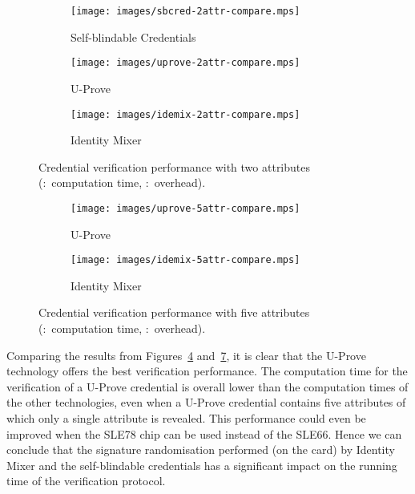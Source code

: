 \begin{figure}
  \centering
  \begin{subfigure}[b]{0.33\textwidth}
    \texttt{[image: images/sbcred-2attr-compare.mps]}
    \caption{Self-blindable Credentials}
    \label{fig:sbcred-2attr}
  \end{subfigure}
  \begin{subfigure}[b]{0.32\textwidth}
    \texttt{[image: images/uprove-2attr-compare.mps]}
    \caption{U-Prove}
    \label{fig:uprove-2attr}
  \end{subfigure}
  \begin{subfigure}[b]{0.32\textwidth}
    \texttt{[image: images/idemix-2attr-compare.mps]}
    \caption{Identity Mixer}
    \label{fig:idemix-2attr}
  \end{subfigure}

  \caption[Credential verification performance with two attributes.]{
    Credential verification performance with two attributes
    (:~computation time,
      :~overhead).}
  \label{fig:2attr-comparison}
\end{figure}

\begin{figure}
  \centering
  \begin{subfigure}[b]{0.48\textwidth}
    \texttt{[image: images/uprove-5attr-compare.mps]}
    \caption{U-Prove}
    \label{fig:uprove-5attr}
  \end{subfigure}
  \begin{subfigure}[b]{0.48\textwidth}
    \texttt{[image: images/idemix-5attr-compare.mps]}
    \caption{Identity Mixer}
    \label{fig:idemix-5attr}
  \end{subfigure}

  \caption[Credential verification performance with five attributes.]{
    Credential verification performance with five attributes
    (:~computation time,
      :~overhead).}
  \label{fig:5attr-comparison}
\end{figure}

Comparing the results from Figures~\ref{fig:2attr-comparison}
and~\ref{fig:5attr-comparison}, it is clear that the U-Prove technology offers
the best verification performance. The computation time for the verification of
a U-Prove credential is overall lower than the computation times of the other
technologies, even when a U-Prove credential contains five attributes of which
only a single attribute is revealed. This performance could even be improved
when the SLE78 chip can be used instead of the SLE66. Hence we can conclude that
the signature randomisation performed (on the card) by Identity Mixer and the self-blindable
credentials has a significant impact on the running time of the verification
protocol.

